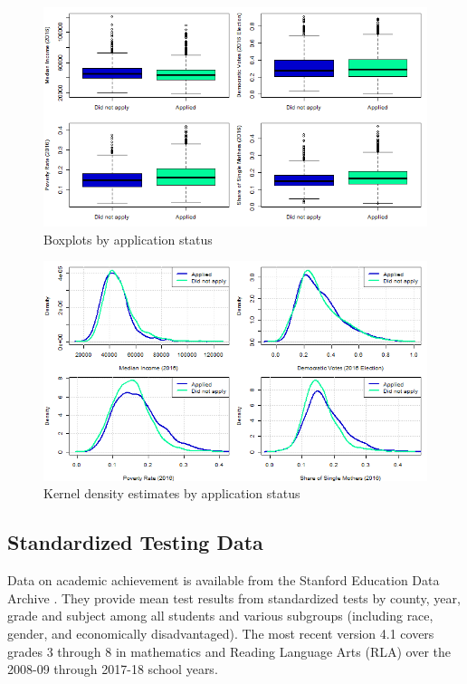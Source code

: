 \begin{figure}[!h]
	\centering
	\includegraphics[scale=0.7]{"../Code & Data/AssistanceCovBoxplot.png"}
	\caption{Boxplots by application status}
	\label{AssistCovBoxplot}
\end{figure}



\begin{figure}[!h]
	\centering
	\includegraphics[scale=0.7]{"../Code & Data/AssistanceCovDensity.png"}
	\caption{Kernel density estimates by application status}
	\label{AssistCovDensity}
\end{figure}


\subsection{Standardized Testing Data}

Data on academic achievement is available from the Stanford Education Data Archive \citep{SEDA}. They provide mean test results from standardized tests by county, year, grade and subject among all students and various subgroups (including race, gender, and economically disadvantaged). The most recent version 4.1 covers grades 3 through 8 in mathematics and Reading Language Arts (RLA) over the 2008-09 through 2017-18 school years.

